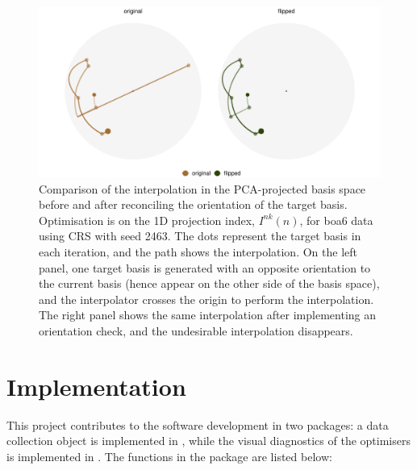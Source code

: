 \begin{Schunk}
\begin{figure}

{\centering \includegraphics[width=1\linewidth]{figs/flip-sign} 

}

\caption[Comparison of the interpolation in the PCA-projected basis space before and after reconciling the orientation of the target basis]{Comparison of the interpolation in the PCA-projected basis space before and after reconciling the orientation of the target basis. Optimisation is on the 1D projection index, $I^{nk}(n)$, for boa6 data using CRS with seed 2463. The dots represent the target basis in each iteration, and the path shows the interpolation. On the left panel, one target basis is generated with an opposite orientation to the current basis (hence appear on the other side of the basis space), and the interpolator crosses the origin to perform the interpolation. The right panel shows the same interpolation after implementing an orientation check, and the undesirable interpolation disappears.}\label{fig:flip-sign}
\end{figure}
\end{Schunk}

\hypertarget{implementation}{%
\section{Implementation}\label{implementation}}

This project contributes to the software development in two packages: a
data collection object is implemented in  \citep{tourr},
while the visual diagnostics of the optimisers is implemented in
 \citep{ferrn}. The functions in the 
\citep{ferrn} package are listed below:

